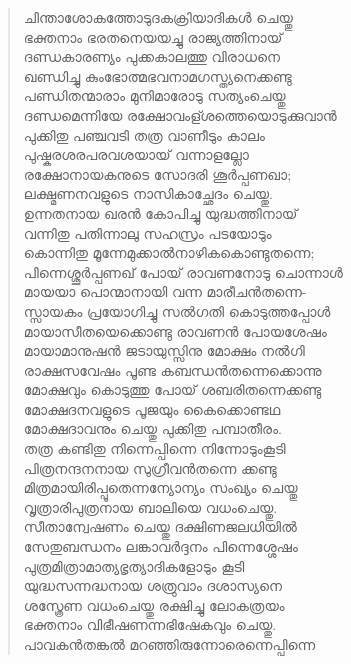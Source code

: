 \begin{verse}
ചിന്താശോകത്തോടുദകക്രിയാദികള്‍ ചെയ്തു\\
ഭക്തനാം ഭരതനെയയച്ചു രാജ്യത്തിനായ്\\
ദണ്ഡകാരണ്യം പുക്കകാലത്തു വിരാധനെ\\
ഖണ്ഡിച്ചു കുംഭോത്മഭവനാമഗസ്ത്യനെക്കണ്ടു\\
പണ്ഡിതന്മാരാം മുനിമാരോടു സത്യംചെയ്തു\\
ദണ്ഡമെന്നിയേ രക്ഷോവംള്ശത്തെയൊടുക്കുവാന്‍\\
പുക്കിതു പഞ്ചവടി തത്ര വാണീടും കാലം\\
പുഷ്കരശരപരവശയായ് വന്നാളല്ലോ\\
രക്ഷോനായകനുടെ സോദരി ശൂര്‍പ്പണഖാ;\\
ലക്ഷ്മണനവളുടെ നാസികാച്ഛേദം ചെയ്തു.\\
ഉന്നതനായ ഖരന്‍ കോപിച്ചു യുദ്ധത്തിനായ്\\
വന്നിതു പതിന്നാലു സഹസ്രം പടയോടും\\
കൊന്നിതു മൂന്നേമുക്കാല്‍നാഴികകൊണ്ടുതന്നെ;\\
പിന്നെശ്ശൂര്‍പ്പണഖ് പോയ് രാവണനോടു ചൊന്നാള്‍\\
മായയാ പൊന്മാനായി വന്ന മാരീചന്‍തന്നെ-\\
സ്സായകം പ്രയോഗിച്ചു സല്‍ഗതി കൊടുത്തപ്പോള്‍\\
മായാസീതയെക്കൊണ്ടു രാവണന്‍ പോയശേഷം\\
മായാമാനുഷന്‍ ജടായുസ്സിനു മോക്ഷം നല്‍ഗി\\
രാക്ഷസവേഷം പൂണ്ട കബന്ധന്‍തന്നെക്കൊന്നു\\
മോക്ഷവും കൊടുത്തു പോയ് ശബരിതന്നെക്കണ്ടു\\
മോക്ഷദനവളുടെ പൂജയും കൈക്കൊണ്ടഥ\\
മോക്ഷദാവനും ചെയ്തു പുക്കിതു പമ്പാതീരം.\\
തത്ര കണ്ടിതു നിന്നെപ്പിന്നെ നിന്നോടുംകൂടി\\ 
പിത്രനന്ദനനായ സുഗ്രീവന്‍തന്നെ ക്കണ്ടു\\
മിത്രമായിരിപ്പൂതെന്നന്യോന്യം സംഖ്യം ചെയ്തു\\
വൃത്രാരിപുത്രനായ ബാലിയെ വധംചെയ്തു.\\
സീതാന്വേഷണം ചെയ്തു ദക്ഷിണജലധിയില്‍\\
സേതുബന്ധനം ലങ്കാവര്‍ദ്ദനം പിന്നെശ്ശേഷം\\
പുത്രമിത്രാമാത്യഭൃത്യാദികളോടും കൂടി\\
യുദ്ധസന്നദ്ധനായ ശത്രുവാം ദശാസ്യനെ\\
ശസ്ത്രേണ വധംചെയ്തു രക്ഷിച്ചു ലോകത്രയം\\
ഭക്തനാം വിഭീഷണന്നഭിഷേകവും ചെയ്തു.\\
പാവകന്‍തങ്കല്‍ മറഞ്ഞിരുന്നോരെന്നെപ്പിന്നെ\\

\end{verse}

